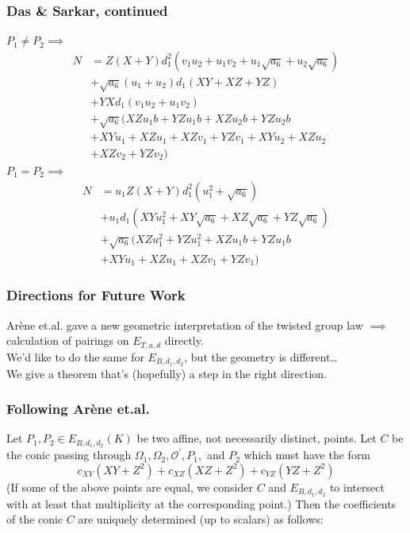\documentclass[xcolor=dvipsnames, handout]{beamer}
\begin{document}
\begin{frame}
    \frametitle{Das \& Sarkar, continued}
    $P_1 \ne P_2 \implies$
    \begin{align*}
        N   &= Z  (X + Y)  d_{1}^{2}  (v_{1} u_{2} + u_{1} v_{2} + u_{1}
                \sqrt{a_6} + u_{2}\sqrt{a_6})\\
            &+ \sqrt{a_6}  (u_{1} + u_{2})  d_{1}  (X Y + X Z + Y Z)\\
            &+ Y  X  d_{1}  (v_{1} u_{2} + u_{1} v_{2})\\
            &+ \sqrt{a_6} (X Z u_{1} b + Y Z u_{1} b + X Z u_{2} b + Y Z u_{2}
                b\\
            &+ X Y u_{1} + X Z u_{1} + X Z v_{1} + Y Z v_{1} + X Y u_{2} + X Z
                u_{2} \\
            &+ X Z v_{2} + Y Z v_{2})
    \end{align*}
    $P_1 = P_2 \implies$
    \begin{align*}
    N   &= u_{1}  Z  (X + Y)  d_{1}^{2}  (u_{1}^{2} + \sqrt{a_6})\\
        &+ u_{1}  d_{1}  (X Y u_{1}^{2} + X Y \sqrt{a_6} + X Z \sqrt{a_6} + Y Z
            \sqrt{a_6})\\
        &+  \sqrt{a_6}  (X Z u_{1}^{2} + Y Z u_{1}^{2} + X Z u_{1} b + Y Z
                u_{1} b\\
        &+ X Y u_{1} + X Z u_{1} + X Z v_{1} + Y Z v_{1})
    \end{align*}
\end{frame}

\begin{frame}
    \frametitle{Directions for Future Work}
    Ar\`ene et.al. gave a new geometric interpretation of the twisted group law
        $\implies$ calculation of pairings on $E_{T, a, d}$ directly.\\
    We'd like to do the same for $E_{B, d_1, d_2}$, but the geometry is
        different\dots\\
    We give a theorem that's (hopefully) a step in the right direction.
\end{frame}

\begin{frame}
    \frametitle{Following Ar\`ene et.al.}
    \begin{theorem}
    Let $P_1, P_2 \in E_{B, d_1, d_2}(K)$ be two affine, not
        necessarily distinct, points.
    Let $C$ be the conic passing through $\Omega_1, \Omega_2,
        \mathcal{O}^\prime, P_1,$ and $P_2$ which must have the form
    \begin{displaymath}
        c_{XY}(XY + Z^2) + c_{XZ}(XZ + Z^2) + c_{YZ}(YZ + Z^2)
    \end{displaymath}
    (If some of the above points are equal, we consider $C$ and $E_{B, d_1,
        d_2}$ to intersect with at least that multiplicity at the corresponding
        point.)
    Then the coefficients of the conic $C$ are uniquely determined (up to
        scalars) as follows:
\end{theorem}
\end{frame}
\end{document}

